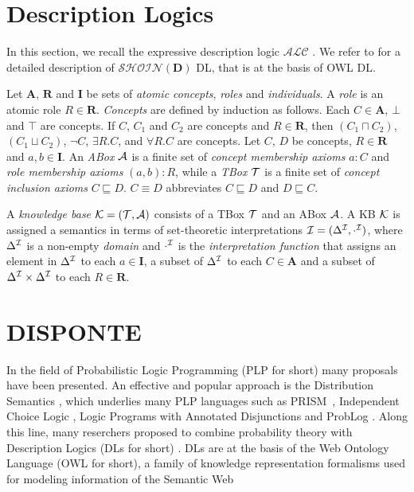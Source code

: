  
\section{Description Logics}
\label{app:dl}
In this section, we recall the expressive description logic $\mathcal{ALC}$ \cite{DBLP:journals/ai/Schmidt-SchaussS91}. We refer to 
\cite{DBLP:journals/ws/LukasiewiczS08} for a detailed description of $\mathcal{SHOIN}(\mathbf{D})$ DL, that is at the basis of OWL DL.

Let $\mathbf{A}$, $\mathbf{R}$ and $\mathbf{I}$ be sets of \emph{atomic concepts}, \emph{roles} and \emph{individuals}.
A \emph{role} is an atomic role $R \in \mathbf{R}$. 
\emph{Concepts} are defined by induction as follows. Each $C \in \mathbf{A}$, $\bot$ and $\top$
are concepts.
If $C$, $C_1$ and $C_2$ are concepts and $R \in \mathbf{R}$, then $(C_1\sqcap C_2)$, $(C_1\sqcup C_2 )$, $\neg C$,
$\exists R.C$, and $\forall R.C$ are concepts. 
Let $C$, $D$ be concepts,  $R \in \mathbf{R}$ and $a, b \in \mathbf{I}$. 
An \emph{ABox} ${\cal A}$ is a finite set of \textit{concept membership axioms} $a : C$ and \textit{role membership
	axioms} $(a, b) : R$, while 
a \emph{TBox} ${\cal T}$ is a finite set of \textit{concept inclusion axioms} $C\sqsubseteq D$. $C \equiv D$ abbreviates $C \sqsubseteq D$ and $D\sqsubseteq  C$.

A \emph{knowledge base} ${\cal K} = ({\cal T}, {\cal A})$ consists of a TBox ${\cal T}$ and an ABox ${\cal A}$.
A KB ${\cal K}$ is assigned a semantics in terms of set-theoretic interpretations ${\cal I} = (\Delta^{\cal I} , \cdot^{\cal I} )$, where $\Delta^{\cal I}$ is a non-empty \textit{domain} and $\cdot^{\cal I}$ is the \textit{interpretation function} that assigns  an element in $\Delta ^{\cal I}$ to each $a \in \mathbf{I}$, a subset of $\Delta^{\cal I}$ to each $C \in \mathbf{A}$ and a subset of $\Delta^{\cal I} \times \Delta^{\cal I}$ to each $R \in \mathbf{R}$.

\section{DISPONTE}
\label{app:disponte}
In the field of Probabilistic Logic Programming (PLP for short) many proposals have been presented. 
An effective and popular approach is the Distribution Semantics \cite{DBLP:conf/iclp/Sato95}, which underlies many PLP languages such as
PRISM~\cite{DBLP:conf/iclp/Sato95,DBLP:journals/jair/SatoK01},
Independent Choice Logic  \cite{Poo97-ArtInt-IJ}, Logic Programs with Annotated Disjunctions \cite{VenVer04-ICLP04-IC} and ProbLog \cite{DBLP:conf/ijcai/RaedtKT07}.
Along this line, many reserchers proposed to combine probability theory with Description Logics (DLs for short) \cite{DBLP:journals/ws/LukasiewiczS08,DBLP:conf/rweb/Straccia08}.
DLs are at the basis of the Web Ontology Language (OWL for short), a family of knowledge representation formalisms used for modeling information
of the Semantic Web

